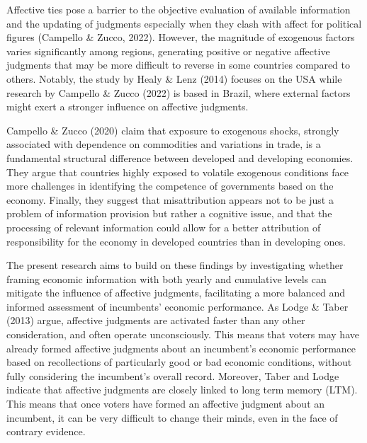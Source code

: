 \documentclass[
]{article}
\begin{document}
Affective ties pose a barrier to the objective evaluation of available
information and the updating of judgments especially when they clash
with affect for political figures (Campello \& Zucco, 2022). However,
the magnitude of exogenous factors varies significantly among regions,
generating positive or negative affective judgments that may be more
difficult to reverse in some countries compared to others. Notably, the
study by Healy \& Lenz (2014) focuses on the USA while research by
Campello \& Zucco (2022) is based in Brazil, where external factors
might exert a stronger influence on affective judgments.

Campello \& Zucco (2020) claim that exposure to exogenous shocks,
strongly associated with dependence on commodities and variations in
trade, is a fundamental structural difference between developed and
developing economies. They argue that countries highly exposed to
volatile exogenous conditions face more challenges in identifying the
competence of governments based on the economy. Finally, they suggest
that misattribution appears not to be just a problem of information
provision but rather a cognitive issue, and that the processing of
relevant information could allow for a better attribution of
responsibility for the economy in developed countries than in developing
ones.

The present research aims to build on these findings by investigating
whether framing economic information with both yearly and cumulative
levels can mitigate the influence of affective judgments, facilitating a
more balanced and informed assessment of incumbents' economic
performance. As Lodge \& Taber (2013) argue, affective judgments are
activated faster than any other consideration, and often operate
unconsciously. This means that voters may have already formed affective
judgments about an incumbent's economic performance based on
recollections of particularly good or bad economic conditions, without
fully considering the incumbent's overall record. Moreover, Taber and
Lodge indicate that affective judgments are closely linked to long term
memory (LTM). This means that once voters have formed an affective
judgment about an incumbent, it can be very difficult to change their
minds, even in the face of contrary evidence.
\end{document}
